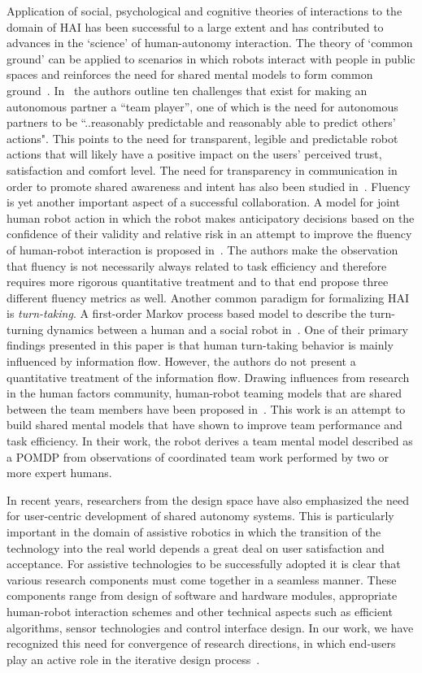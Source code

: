 \documentclass[12pt]{article}
\begin{document}
Application of social, psychological and cognitive theories of interactions to the domain of HAI has been successful to a large extent and has contributed to advances in the `science' of human-autonomy interaction. The theory of `common ground' can be applied to scenarios in which robots interact with people in public spaces and reinforces the need for shared mental models to form common ground~\cite{kiesler2005fostering}. In~\cite{klien2004ten} the authors outline ten challenges that exist for making an autonomous partner a ``team player'', one of which is the need for autonomous partners to be ``..reasonably predictable and reasonably able to predict others' actions". This points to the need for transparent, legible and predictable robot actions that will likely have a positive impact on the users' perceived trust, satisfaction and comfort level. The need for transparency in communication in order to promote shared awareness and intent has also been studied in~\cite{lyons2014transparency}. Fluency is yet another important aspect of a successful collaboration. A model for joint human robot action in which the robot makes anticipatory decisions based on the confidence of their validity and relative risk in an attempt to improve the fluency of human-robot interaction is proposed in~\cite{hoffman2007cost}. The authors make the observation that fluency is not necessarily always related to task efficiency and therefore requires more rigorous quantitative treatment and to that end propose three different fluency metrics as well. Another common paradigm for formalizing HAI is \textit{turn-taking}. A first-order Markov process based model to describe the turn-turning dynamics between a human and a social robot in~\cite{thomaz2011turn}. One of their primary findings presented in this paper is that human turn-taking behavior is mainly influenced by information flow. However, the authors do not present a quantitative treatment of the information flow. Drawing influences from research in the human factors community, human-robot teaming models that are shared between the team members have been proposed in~\cite{nikolaidis2012human}. This work is an attempt to build shared mental models that have shown to improve team performance and task efficiency. In their work, the robot derives a team mental model described as a POMDP from observations of coordinated team work performed by two or more expert humans. 

In recent years, researchers from the design space have also emphasized the need for user-centric development of shared autonomy systems. This is particularly important in the domain of assistive robotics in which the transition of the technology into the real world depends a great deal on user satisfaction and acceptance. For assistive technologies to be successfully adopted it is clear that various research components must come together in a seamless manner. These components range from design of software and hardware modules, appropriate human-robot interaction schemes and other technical aspects such as efficient algorithms, sensor technologies and control interface design. In our work, we have recognized this need for convergence of research directions, in which end-users play an active role in the iterative design process~\cite{egli2016call}. 
\end{document}
